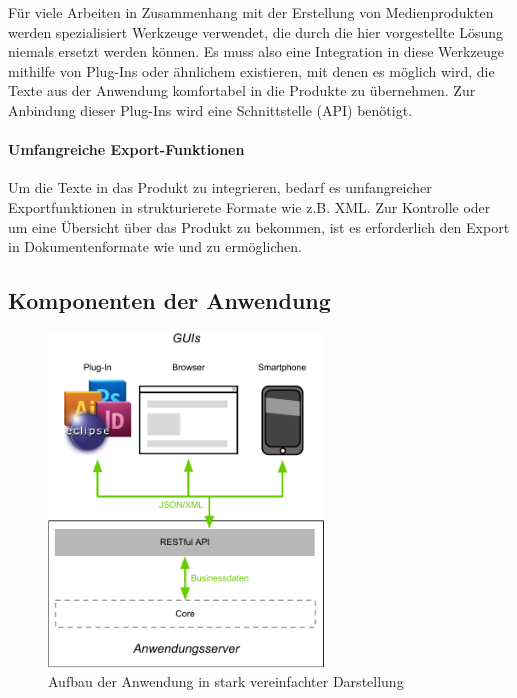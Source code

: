 Für viele Arbeiten in Zusammenhang mit der Erstellung von Medienprodukten werden spezialisiert Werkzeuge verwendet, die durch die hier vorgestellte Lösung niemals ersetzt werden können. Es muss also eine Integration in diese Werkzeuge mithilfe von Plug-Ins oder ähnlichem existieren, mit denen es möglich wird, die Texte aus der Anwendung komfortabel in die Produkte zu übernehmen. Zur Anbindung dieser Plug-Ins wird eine Schnittstelle (API) benötigt.

\paragraph{Umfangreiche Export-Funktionen}

Um die Texte in das Produkt zu integrieren, bedarf es umfangreicher Exportfunktionen in strukturierete Formate wie z.B. XML. Zur Kontrolle oder um eine Übersicht über das Produkt zu bekommen, ist es erforderlich den Export in Dokumentenformate wie  und  zu ermöglichen.

\pagebreak

\subsection{Komponenten der Anwendung}\label{l:loesungsart}

\begin{figure}[htb]
\begin{center}
\includegraphics[width=0.65\textwidth]{media/ArtdesSystems.pdf}
\caption{Aufbau der Anwendung in stark vereinfachter Darstellung}
\label{chart:aufbaudessystems}
\end{center}
\end{figure}

